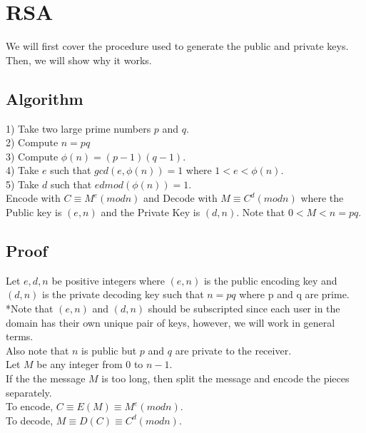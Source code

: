 \documentclass{article}
\begin{document}
\section{RSA}
We will first cover the procedure used to generate the public and private keys. Then, we will show why it works. 

\subsection{Algorithm}
1) Take two large prime numbers $p$ and $q$. \\
2) Compute $n = pq$ \\
3) Compute $\phi(n) = (p-1)(q-1)$. \\
4) Take $e$ such that $gcd(e,\phi(n)) = 1$ where $1 < e < \phi(n)$. \\
5) Take $d$ such that $ed mod(\phi(n)) = 1$. \\

\noindent Encode with $C \equiv M^e (modn)$ and Decode with $M \equiv C^d (modn)$ where the Public key is $(e,n)$ and the Private Key is $(d,n)$. Note that $0 < M < n = pq$. 

\subsection{Proof}

\indent\indent Let $e, d, n$ be positive integers where $(e,n)$ is the public encoding key and $(d,n)$ is the private decoding key such that $n = pq$ where p and q are prime. \\

*Note that $(e,n)$ and $(d,n)$ should be subscripted since each user in the domain has their own unique pair of keys, however, we will work in general terms. \\

Also note that $n$ is public but $p$ and $q$ are private to the receiver. \\

Let $M$ be any integer from $0$ to $n-1$. \\

If the the message $M$ is too long, then split the message and encode the pieces separately. \\

To encode, $C \equiv E(M) \equiv M^e (modn)$. \\

To decode, $M \equiv D(C) \equiv C^d (modn)$. \\
\end{document}
